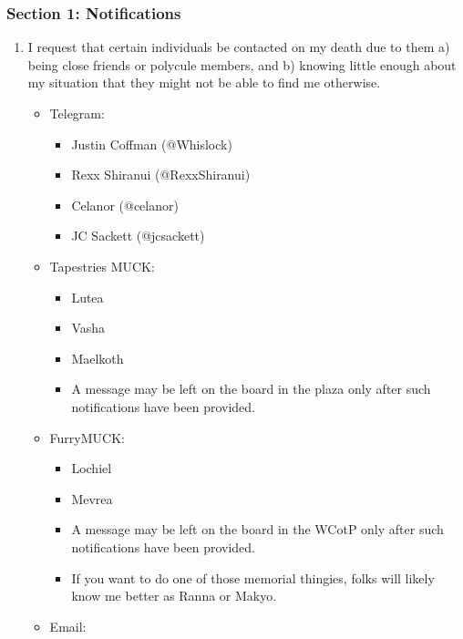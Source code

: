 \subsubsection*{Section 1: Notifications}\label{section-1-notifications}

\begin{enumerate}
\def\labelenumi{\arabic{enumi}.}
\tightlist
\item
  I request that certain individuals be contacted on my death due to them a) being close friends or polycule members, and b) knowing little enough about my situation that they might not be able to find me otherwise.

  \begin{itemize}
  \tightlist
  \item
    Telegram:

    \begin{itemize}
    \tightlist
    \item
      Justin Coffman (@Whislock)
    \item
      Rexx Shiranui (@RexxShiranui)
    \item
      Celanor (@celanor)
    \item
      JC Sackett (@jcsackett)
    \end{itemize}
  \item
    Tapestries MUCK:

    \begin{itemize}
    \tightlist
    \item
      Lutea
    \item
      Vasha
    \item
      Maelkoth
    \item
      A message may be left on the board in the plaza only after such notifications have been provided.
    \end{itemize}
  \item
    FurryMUCK:

    \begin{itemize}
    \tightlist
    \item
      Lochiel
    \item
      Mevrea
    \item
      A message may be left on the board in the WCotP only after such notifications have been provided.
    \item
      If you want to do one of those memorial thingies, folks will likely know me better as Ranna or Makyo.
    \end{itemize}
  \item
    Email:


\end{itemize}
\end{enumerate}
